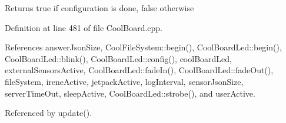 \begin{DoxyReturn}{Returns}
true if configuration is done, false otherwise 
\end{DoxyReturn}


Definition at line 481 of file Cool\+Board.\+cpp.



References answer\+Json\+Size, Cool\+File\+System\+::begin(), Cool\+Board\+Led\+::begin(), Cool\+Board\+Led\+::blink(), Cool\+Board\+Led\+::config(), cool\+Board\+Led, external\+Sensors\+Active, Cool\+Board\+Led\+::fade\+In(), Cool\+Board\+Led\+::fade\+Out(), file\+System, irene\+Active, jetpack\+Active, log\+Interval, sensor\+Json\+Size, server\+Time\+Out, sleep\+Active, Cool\+Board\+Led\+::strobe(), and user\+Active.



Referenced by update().


